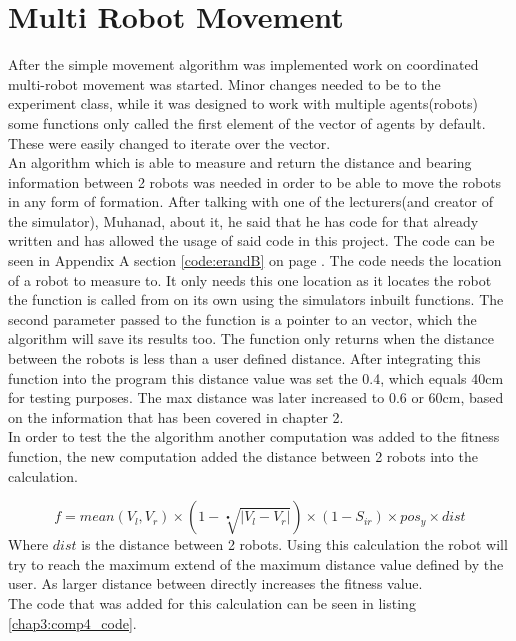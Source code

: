\section{Multi Robot Movement}
After the simple movement algorithm was implemented work on coordinated multi-robot movement was started.
Minor changes needed to be to the experiment class, while it was designed to work with multiple agents(robots) some functions only called the first element of the vector of agents by default. These were easily changed to iterate over the vector. \\

An algorithm which is able to measure and return the distance and bearing information between 2 robots was needed in order to be able to move the robots in any form of formation. After talking with one of the lecturers(and creator of the simulator), Muhanad,  about it, he said that he has code for that already written and has allowed the usage of said code in this project. The code can be seen in Appendix A section \ref{code:erandB} on page \pageref{code:erandB}.
The code needs the location of a robot to measure to. It only needs this one location as it locates the robot the function is called from on its own using the simulators inbuilt functions.  The second parameter passed to the function is a pointer to an vector, which the algorithm will save its results too. 
The function only returns when the distance between the robots is less than a user defined distance. After integrating this function into the program this distance value was set the 0.4, which equals 40cm for testing purposes. 
The max distance was later increased to 0.6 or 60cm, based on the information that has been covered in chapter 2. \\

In order to test the the algorithm another computation was added to the fitness function, the new computation added the distance between 2 robots into the calculation.

\begin{equation}
f = mean(V_l, V_r) \times ( 1 - \sqrt[•]{|V_l - V_r|}) \times (1 - S_{ir}) \times pos_y \times dist
\end{equation}
Where $dist$ is the distance between 2 robots. Using this calculation the robot will try to reach the maximum extend of the maximum distance value defined by the user.
As larger distance between directly increases the fitness value. \\
The code that was added for this calculation can be seen in listing \ref{chap3:comp4_code}.

